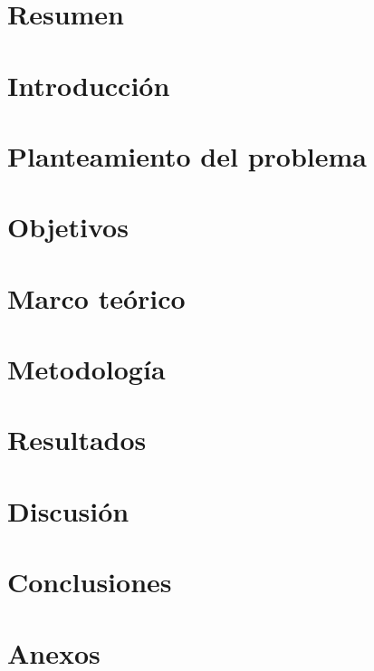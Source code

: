 \documentclass[11pt]{article}
\theoremstyle{mytheoremstyle}
\theoremstyle{mytheoremstyle}
\theoremstyle{myproblemstyle}
\begin{document}
\section{Resumen}
    

\section{Introducción}
    

\section{Planteamiento del problema}
    

\section{Objetivos}
    

\section{Marco teórico}
    

\section{Metodología}
    

\section{Resultados}
    

\section{Discusión}
    

\section{Conclusiones}
    

\printbibliography

\clearpage
{} %

\section*{Anexos}

\end{document}
